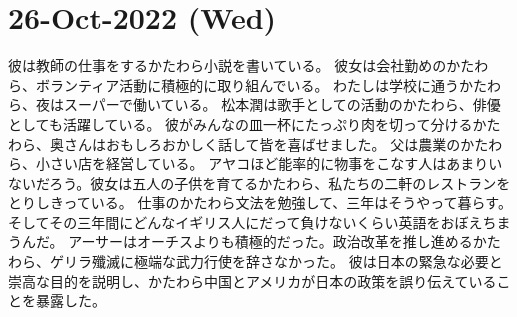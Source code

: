 \section{26-Oct-2022 (Wed)}
彼は教師の仕事をするかたわら小説を書いている。
彼女は会社勤めのかたわら、ボランティア活動に積極的に取り組んでいる。
わたしは学校に通うかたわら、夜はスーパーで働いている。
松本潤は歌手としての活動のかたわら、俳優としても活躍している。
彼がみんなの皿一杯にたっぷり肉を切って分けるかたわら、奥さんはおもしろおかしく話して皆を喜ばせました。
父は農業のかたわら、小さい店を経営している。
アヤコほど能率的に物事をこなす人はあまりいないだろう。彼女は五人の子供を育てるかたわら、私たちの二軒のレストランをとりしきっている。
仕事のかたわら文法を勉強して、三年はそうやって暮らす。そしてその三年間にどんなイギリス人にだって負けないくらい英語をおぼえちまうんだ。
アーサーはオーチスよりも積極的だった。政治改革を推し進めるかたわら、ゲリラ殲滅に極端な武力行使を辞さなかった。
彼は日本の緊急な必要と崇高な目的を説明し、かたわら中国とアメリカが日本の政策を誤り伝えていることを暴露した。